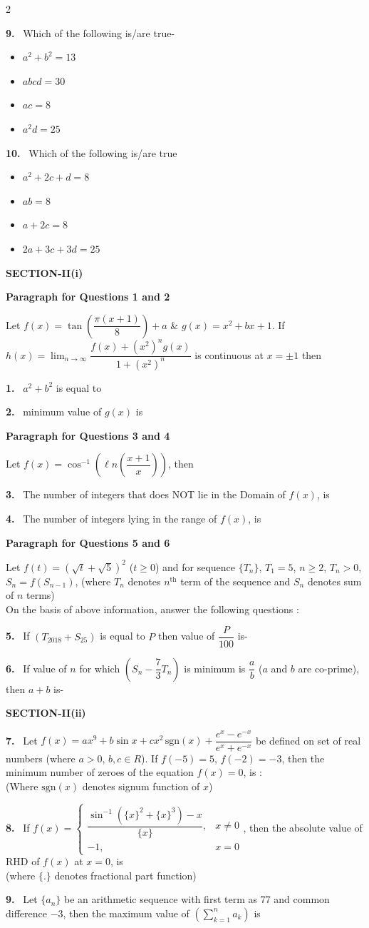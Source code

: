 \documentclass[10pt]{extarticle}
\newcommand{\sect}[1]{\par\smallskip\noindent\textbf{#1}\par}
\newcommand{\qn}[1]{\par\smallskip\noindent\textbf{#1.}~}
\newcommand{\paraq}[2]{\par\smallskip\noindent\textbf{Paragraph for Questions #1 and #2}\par}
\newenvironment{qoptions}{\begin{itemize}[leftmargin=1.8em,itemsep=1pt,topsep=2pt,label={}]}{\end{itemize}}
\newcommand{\opt}[2]{\item[(#1)] #2}
\begin{document}
\begin{multicols}{2}
\qn{9} Which of the following is/are true-
\begin{qoptions}
\opt{A}{$a^2+b^2=13$}
\opt{B}{$abcd=30$}
\opt{C}{$ac=8$}
\opt{D}{$a^2d=25$}
\end{qoptions}
\qn{10} Which of the following is/are true
\begin{qoptions}
\opt{A}{$a^2+2c+d=8$}
\opt{B}{$ab=8$}
\opt{C}{$a+2c=8$}
\opt{D}{$2a+3c+3d=25$}
\end{qoptions}
\sect{SECTION-II(i)}
\paraq{1}{2}
Let $f(x)=\tan\left(\dfrac{\pi(x+1)}{8}\right)+a$ \& $g(x)=x^2+bx+1$. If $h(x)=\displaystyle\lim_{n\to\infty}\dfrac{f(x)+(x^2)^ng(x)}{1+(x^2)^n}$ is continuous at $x=\pm1$ then
\qn{1} $a^2+b^2$ is equal to
\qn{2} minimum value of $g(x)$ is
\paraq{3}{4}
Let $f(x)=\cos^{-1}\left(\ell n\left(\dfrac{x+1}{x}\right)\right)$, then
\qn{3} The number of integers that does NOT lie in the Domain of $f(x)$, is
\qn{4} The number of integers lying in the range of $f(x)$, is
\paraq{5}{6}
Let $f(t)=\left(\sqrt t+\sqrt5\right)^2$ ($t\geqslant0$) and for sequence $\{T_n\}$, $T_1=5$, $n\geq2$, $T_n>0$, $S_n=f(S_{n-1})$, (where $T_n$ denotes $n^{\text{th}}$ term of the sequence and $S_n$ denotes sum of $n$ terms)\\
On the basis of above information, answer the following questions :
\qn{5} If $(T_{2018}+S_{25})$ is equal to $P$ then value of $\dfrac{P}{100}$ is-
\qn{6} If value of $n$ for which $\left(S_n-\dfrac73T_n\right)$ is minimum is $\dfrac ab$ ($a$ and $b$ are co-prime), then $a+b$ is-
\sect{SECTION-II(ii)}
\qn{7} Let $f(x)=ax^9+b\sin x+cx^2\,\mathrm{sgn}(x)+\dfrac{e^x-e^{-x}}{e^x+e^{-x}}$ be defined on set of real numbers (where $a>0$, $b,c\in R$). If $f(-5)=5$, $f(-2)=-3$, then the minimum number of zeroes of the equation $f(x)=0$, is :\\
(Where $\mathrm{sgn}(x)$ denotes signum function of $x$)
\qn{8} If $f(x)=\begin{cases}\dfrac{\sin^{-1}(\{x\}^2+\{x\}^3)-x}{\{x\}}, & x\neq0\\ -1, & x=0\end{cases}$, then the absolute value of RHD of $f(x)$ at $x=0$, is\\
(where $\{.\}$ denotes fractional part function)
\qn{9} Let $\{a_n\}$ be an arithmetic sequence with first term as 77 and common difference $-3$, then the maximum value of $\left(\displaystyle\sum_{k=1}^{n}a_k\right)$ is
\end{multicols}
\end{document}
